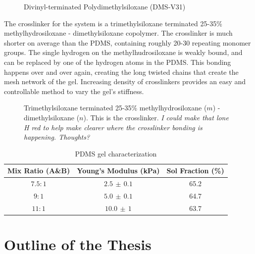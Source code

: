 \begin{figure}[h!]
	\centering
\label{fig:DMS-V31}
\caption[DMS-V31]{Divinyl-terminated Polydimethylsiloxane (DMS-V31)}
\end{figure}

The crosslinker for the system is a trimethylsiloxane terminated 25-35\% methylhydrosiloxane - dimethylsiloxane copolymer. The crosslinker is much shorter on average than the PDMS, containing roughly 20-30 repeating monomer groups. The single hydrogen on the methylhudrosiloxane is weakly bound, and can be replaced by one of the hydrogen atoms in the PDMS. This bonding happens over and over again, creating the long twisted chains that create the mesh network of the gel. Increasing density of crosslinkers provides an easy and controllable method to vary the gel's stiffness.

\begin{figure}
	\centering
\label{fig:HMS-301}
\caption[HMS-301]{Trimethylsiloxane terminated 25-35\% methylhydrosiloxane ($m$) - dimethylsiloxane ($n$). This is the crosslinker. \emph{I could make that lone H red to help make clearer where the crosslinker bonding is happening. Thoughts?}}
\end{figure}

\begin{table}[h!]
	\caption[PDMS ratios Characterization]{PDMS gel characterization}
	\begin{center}
		\begin{tabular}{|c||c||c|}
			\hline
			Mix Ratio (A\&B) & Young's Modulus (kPa) & Sol Fraction (\%)\\
			\hline
			$7.5:1$ & $2.5 \,\pm\, 0.1$ & 65.2\\
			\hline
			$9:1$ & $5.0 \, \pm\, 0.1$  & 64.7\\
			\hline
			$11:1$ & $10.0 \,\pm\, 1$  & 63.7\\
			\hline
		\end{tabular}
	\end{center}
\label{tab:recipes}
\end{table}

\section{Outline of the Thesis}


